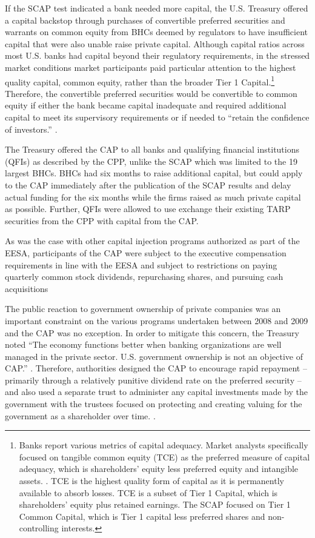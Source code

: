 \documentclass[12pt]{article}
\begin{document}
If the SCAP test indicated a bank needed more capital, the U.S. Treasury offered a capital backstop through purchases of convertible preferred securities and warrants on common equity from BHCs deemed by regulators to have insufficient capital that were also unable raise private capital. Although capital ratios across most U.S. banks had capital beyond their regulatory requirements, in the stressed market conditions market participants paid particular attention to the highest quality capital, common equity, rather than the broader Tier 1 Capital.\footnote{Banks report various metrics of capital adequacy. Market analysts specifically focused on tangible common equity (TCE) as the preferred measure of capital adequacy, which is shareholders' equity less preferred equity and intangible assets. \citep{GW}. TCE is the highest quality form of capital as it is permanently available to absorb losses. TCE is a subset of Tier 1 Capital, which is shareholders' equity plus retained earnings. The SCAP focused on Tier 1 Common Capital, which is Tier 1 capital less preferred shares and non-controlling interests.} Therefore, the convertible preferred securities would be convertible to common equity if either the bank became capital inadequate and required additional capital to meet its supervisory requirements or if needed to ``retain the confidence of investors.'' \citep{WhitePaper}.


The Treasury offered the CAP to all banks and qualifying financial institutions (QFIs) as described by the CPP, unlike the SCAP which was limited to the 19 largest BHCs. BHCs had six months to raise additional capital, but could apply to the CAP immediately after the publication of the SCAP results and delay actual funding for the six months while the firms raised as much private capital as possible. Further, QFIs were allowed to use exchange their existing TARP securities from the CPP with capital from the CAP. 


As was the case with other capital injection programs authorized as part of the EESA, participants of the CAP were subject to the executive compensation requirements in line with the EESA and subject to restrictions on paying quarterly common stock dividends, repurchasing shares, and pursuing cash acquisitions


The public reaction to government ownership of private companies was an important constraint on the various programs undertaken between 2008 and 2009 and the CAP was no exception. In order to mitigate this concern, the Treasury noted “The economy functions better when banking organizations are well managed in the private sector. U.S. government ownership is not an objective of CAP.'' \citep{WhitePaper}. Therefore, authorities designed the CAP to encourage rapid repayment -- primarily through a relatively punitive dividend rate on the preferred security -- and also used a separate trust to administer any capital investments made by the government with the trustees focused on protecting and creating valuing for the government as a shareholder over time. \citep{WhitePaper}.
\end{document}
